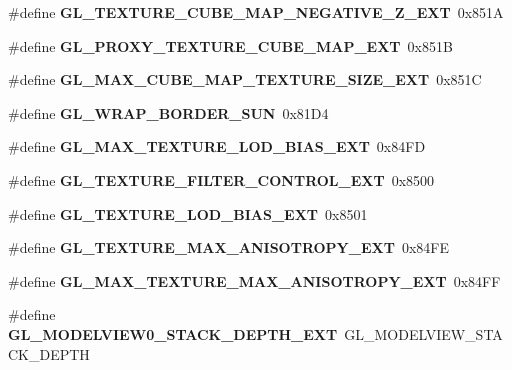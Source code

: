 \begin{DoxyCompactItemize}
\item 
\#define {\bfseries G\+L\+\_\+\+T\+E\+X\+T\+U\+R\+E\+\_\+\+C\+U\+B\+E\+\_\+\+M\+A\+P\+\_\+\+N\+E\+G\+A\+T\+I\+V\+E\+\_\+\+Z\+\_\+\+E\+X\+T}~0x851\+A\label{_s_d_l__opengl_8h_a6e83377b6abfd6f4745f54be6325c689}

\item 
\#define {\bfseries G\+L\+\_\+\+P\+R\+O\+X\+Y\+\_\+\+T\+E\+X\+T\+U\+R\+E\+\_\+\+C\+U\+B\+E\+\_\+\+M\+A\+P\+\_\+\+E\+X\+T}~0x851\+B\label{_s_d_l__opengl_8h_a677dbdc42b7c2a3f6f668d25f6bdea7c}

\item 
\#define {\bfseries G\+L\+\_\+\+M\+A\+X\+\_\+\+C\+U\+B\+E\+\_\+\+M\+A\+P\+\_\+\+T\+E\+X\+T\+U\+R\+E\+\_\+\+S\+I\+Z\+E\+\_\+\+E\+X\+T}~0x851\+C\label{_s_d_l__opengl_8h_acdc8946afc66c01af845a27b822733a7}

\item 
\#define {\bfseries G\+L\+\_\+\+W\+R\+A\+P\+\_\+\+B\+O\+R\+D\+E\+R\+\_\+\+S\+U\+N}~0x81\+D4\label{_s_d_l__opengl_8h_ae096303460a67ed2755629b6d72d9f6d}

\item 
\#define {\bfseries G\+L\+\_\+\+M\+A\+X\+\_\+\+T\+E\+X\+T\+U\+R\+E\+\_\+\+L\+O\+D\+\_\+\+B\+I\+A\+S\+\_\+\+E\+X\+T}~0x84\+F\+D\label{_s_d_l__opengl_8h_a14d72e2a9325309a2f2ee86445c34432}

\item 
\#define {\bfseries G\+L\+\_\+\+T\+E\+X\+T\+U\+R\+E\+\_\+\+F\+I\+L\+T\+E\+R\+\_\+\+C\+O\+N\+T\+R\+O\+L\+\_\+\+E\+X\+T}~0x8500\label{_s_d_l__opengl_8h_afe93fba1ee48590f7c4be6144e97bae4}

\item 
\#define {\bfseries G\+L\+\_\+\+T\+E\+X\+T\+U\+R\+E\+\_\+\+L\+O\+D\+\_\+\+B\+I\+A\+S\+\_\+\+E\+X\+T}~0x8501\label{_s_d_l__opengl_8h_ada8467789b03ea2ef0ec9cdfca65877a}

\item 
\#define {\bfseries G\+L\+\_\+\+T\+E\+X\+T\+U\+R\+E\+\_\+\+M\+A\+X\+\_\+\+A\+N\+I\+S\+O\+T\+R\+O\+P\+Y\+\_\+\+E\+X\+T}~0x84\+F\+E\label{_s_d_l__opengl_8h_a00b65957cb070504d8e364031b176737}

\item 
\#define {\bfseries G\+L\+\_\+\+M\+A\+X\+\_\+\+T\+E\+X\+T\+U\+R\+E\+\_\+\+M\+A\+X\+\_\+\+A\+N\+I\+S\+O\+T\+R\+O\+P\+Y\+\_\+\+E\+X\+T}~0x84\+F\+F\label{_s_d_l__opengl_8h_ad1cf646d8224fdedcce963d095f71c1b}

\item 
\#define {\bfseries G\+L\+\_\+\+M\+O\+D\+E\+L\+V\+I\+E\+W0\+\_\+\+S\+T\+A\+C\+K\+\_\+\+D\+E\+P\+T\+H\+\_\+\+E\+X\+T}~G\+L\+\_\+\+M\+O\+D\+E\+L\+V\+I\+E\+W\+\_\+\+S\+T\+A\+C\+K\+\_\+\+D\+E\+P\+T\+H\label{_s_d_l__opengl_8h_a1e220d5d86161de155620c3dcc6a71bf}


\end{DoxyCompactItemize}
